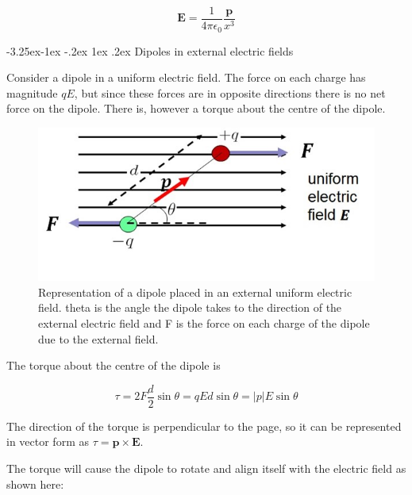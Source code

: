 \documentclass[
]{book}
\makeatletter
\renewcommand\subsection{%
\@startsection{subsection}{2}{\z@}%
              {-3.25ex\@plus -1ex \@minus -.2ex}%
              {1ex \@plus .2ex}%
              {\sffamily\bfseries}}
\makeatother
\begin{document}
\begin{equation}
\label{eq:EvsP}
\mathbf{E} = \frac{1}{4\pi \epsilon_0} \frac{\mathbf{p}}{x^3}
\end{equation}

\hypertarget{dipoles-in-external-electric-fields}{%
\subsection{Dipoles in external electric fields}\label{dipoles-in-external-electric-fields}}

Consider a dipole in a uniform electric field. The force on each charge
has magnitude \(qE\), but since these forces are in opposite directions
there is no net force on the dipole. There is, however a torque about
the centre of the dipole.

\begin{figure}

{\centering \includegraphics[width=0.7\linewidth]{Figures/dipole_extE} 

}

\caption{Representation of a dipole placed in an external uniform electric field. theta is the angle the dipole takes to the direction of the external electric field and F is the force on each charge of the dipole due to the external field.}\label{fig:dipoleExtE}
\end{figure}

The torque about the centre of the dipole is

\begin{equation}
\label{eq:torqueDipole}
\tau = 2 F \frac{d}{2} \sin\theta = q E d \sin\theta = |p|E \sin\theta
\end{equation}

The direction of the torque is perpendicular to the page, so it can be
represented in vector form as \(\tau = \mathbf{p} \times \mathbf{E}\).

The torque will cause the dipole to rotate and align itself with the
electric field as shown here:
\end{document}
